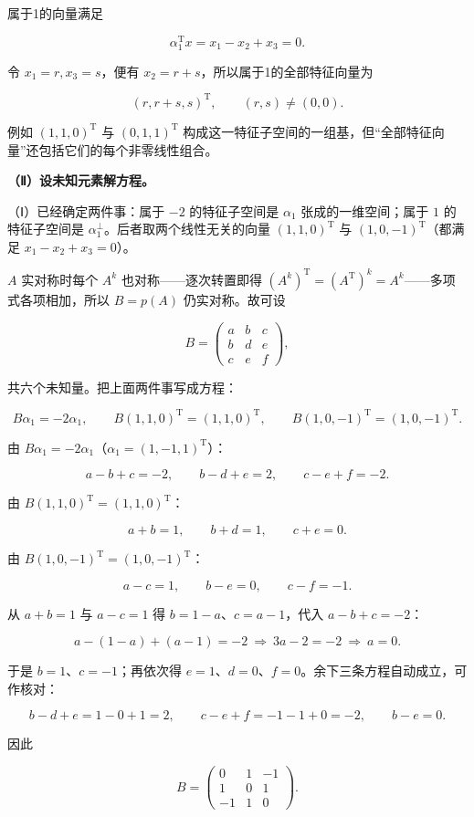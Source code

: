 \documentclass[UTF8,11pt,fontset=windows]{ctexart}
\begin{document}
属于1的向量满足

$$
\alpha_1^{\mathrm T}x=x_1-x_2+x_3=0.
$$

令 $x_1=r,x_3=s$，便有 $x_2=r+s$，所以属于1的全部特征向量为

$$
\boxed{(r,r+s,s)^{\mathrm T},\qquad(r,s)\ne(0,0).}
$$

例如 $(1,1,0)^{\mathrm T}$ 与 $(0,1,1)^{\mathrm T}$ 构成这一特征子空间的一组基，但“全部特征向量”还包括它们的每个非零线性组合。

\textbf{（Ⅱ）设未知元素解方程。}

（Ⅰ）已经确定两件事：属于 $-2$ 的特征子空间是 $\alpha_1$ 张成的一维空间；属于 $1$ 的特征子空间是 $\alpha_1^{\perp}$。后者取两个线性无关的向量 $(1,1,0)^{\mathrm T}$ 与 $(1,0,-1)^{\mathrm T}$（都满足 $x_1-x_2+x_3=0$）。

$A$ 实对称时每个 $A^{k}$ 也对称——逐次转置即得 $(A^{k})^{\mathrm T}=(A^{\mathrm T})^{k}=A^{k}$——多项式各项相加，所以 $B=p(A)$ 仍实对称。故可设

$$
B=\begin{pmatrix}a&b&c\\b&d&e\\c&e&f\end{pmatrix},
$$

共六个未知量。把上面两件事写成方程：

$$
B\alpha_1=-2\alpha_1,
\qquad
B(1,1,0)^{\mathrm T}=(1,1,0)^{\mathrm T},
\qquad
B(1,0,-1)^{\mathrm T}=(1,0,-1)^{\mathrm T}.
$$

由 $B\alpha_1=-2\alpha_1$（$\alpha_1=(1,-1,1)^{\mathrm T}$）：

$$
a-b+c=-2,\qquad b-d+e=2,\qquad c-e+f=-2.
$$

由 $B(1,1,0)^{\mathrm T}=(1,1,0)^{\mathrm T}$：

$$
a+b=1,\qquad b+d=1,\qquad c+e=0.
$$

由 $B(1,0,-1)^{\mathrm T}=(1,0,-1)^{\mathrm T}$：

$$
a-c=1,\qquad b-e=0,\qquad c-f=-1.
$$

从 $a+b=1$ 与 $a-c=1$ 得 $b=1-a$、$c=a-1$，代入 $a-b+c=-2$：

$$
a-(1-a)+(a-1)=-2
\ \Longrightarrow\
3a-2=-2
\ \Longrightarrow\
a=0.
$$

于是 $b=1$、$c=-1$；再依次得 $e=1$、$d=0$、$f=0$。余下三条方程自动成立，可作核对：

$$
b-d+e=1-0+1=2,\qquad c-e+f=-1-1+0=-2,\qquad b-e=0.
$$

因此

$$
\boxed{B=\begin{pmatrix}0&1&-1\\1&0&1\\-1&1&0\end{pmatrix}.}
$$
\end{document}
